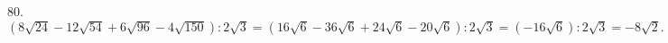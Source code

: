 80. $(8\sqrt{24}-12\sqrt{54}+6\sqrt{96}-4\sqrt{150}):2\sqrt{3}=
(16\sqrt{6}-36\sqrt{6}+24\sqrt{6}-20\sqrt{6}):2\sqrt{3}=(-16\sqrt{6}):2\sqrt{3}=-8\sqrt{2}.$\\
